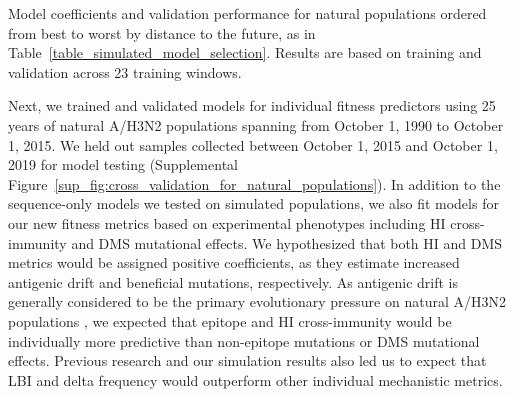 \begin{table}[ht]
  \begin{center}
    
    \caption{
      Model coefficients and validation performance for natural populations ordered from best to worst by distance to the future, as in Table~\ref{table_simulated_model_selection}.
      Results are based on training and validation across 23 training windows.
    }
    \label{table_natural_model_selection}
  \end{center}
\end{table}

Next, we trained and validated models for individual fitness predictors using 25 years of natural A/H3N2 populations spanning from October 1, 1990 to October 1, 2015.
We held out samples collected between October 1, 2015 and October 1, 2019 for model testing (Supplemental Figure~\ref{sup_fig:cross_validation_for_natural_populations}).
In addition to the sequence-only models we tested on simulated populations, we also fit models for our new fitness metrics based on experimental phenotypes including HI cross-immunity and DMS mutational effects.
We hypothesized that both HI and DMS metrics would be assigned positive coefficients, as they estimate increased antigenic drift and beneficial mutations, respectively.
As antigenic drift is generally considered to be the primary evolutionary pressure on natural A/H3N2 populations \cite{Smith:2004jc,Bedford:2014bf,Luksza:2014hj}, we expected that epitope and HI cross-immunity would be individually more predictive than non-epitope mutations or DMS mutational effects.
Previous research \cite{Neher:2016hy} and our simulation results also led us to expect that LBI and delta frequency would outperform other individual mechanistic metrics.

